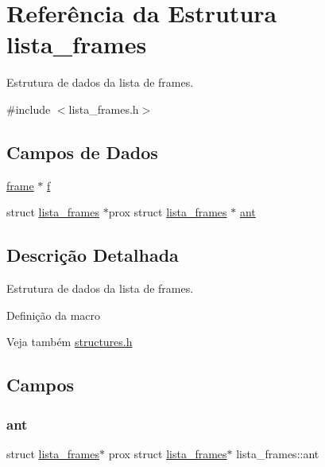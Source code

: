 \hypertarget{structlista__frames}{}\section{Referência da Estrutura lista\+\_\+frames}
\label{structlista__frames}


Estrutura de dados da lista de frames.  




{\ttfamily \#include $<$lista\+\_\+frames.\+h$>$}

\subsection*{Campos de Dados}
\begin{DoxyCompactItemize}
\item 
\hyperlink{structframe}{frame} $\ast$ \hyperlink{structlista__frames_ad7777179f480ab04a686cf8edf19addf}{f}
\item 
struct \hyperlink{structlista__frames}{lista\+\_\+frames} $\ast$prox struct \hyperlink{structlista__frames}{lista\+\_\+frames} $\ast$ \hyperlink{structlista__frames_a0bbbab3447435d5c260502d64b038551}{ant}
\end{DoxyCompactItemize}


\subsection{Descrição Detalhada}
Estrutura de dados da lista de frames. 

Definição da macro

\begin{DoxySeeAlso}{Veja também}
\hyperlink{structures_8h}{structures.\+h} 
\end{DoxySeeAlso}


\subsection{Campos}
\mbox{\label{structlista__frames_a0bbbab3447435d5c260502d64b038551}} 
\subsubsection{\texorpdfstring{ant}{ant}}
{\footnotesize\ttfamily struct \hyperlink{structlista__frames}{lista\+\_\+frames}$\ast$ prox struct \hyperlink{structlista__frames}{lista\+\_\+frames}$\ast$ lista\+\_\+frames\+::ant}

